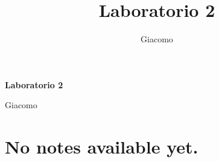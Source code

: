 \documentclass{article}
\title{Laboratorio 2}
\author{Giacomo}
\begin{document}
\begin{titlepage}
    

    \centering
    {\Huge\bfseries Laboratorio 2\par}
    \vspace{1.5cm}
    {\large Giacomo\par}
\end{titlepage}





\section*{No notes available yet.}
\end{document}
